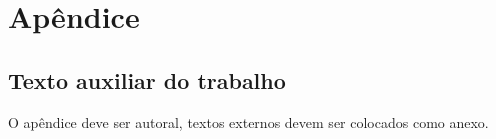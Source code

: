\chapter{Apêndice}
\label{Ap}
\thispagestyle{empty}
\label{apendA}
\newpage

\section{Texto auxiliar do trabalho}

O apêndice deve ser autoral, textos externos devem ser colocados como anexo.